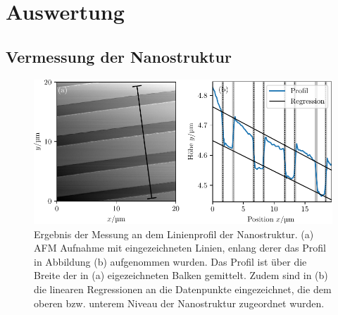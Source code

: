 \section{Auswertung}


\subsection{Vermessung der Nanostruktur}



\begin{figure}
  \centering
  \includegraphics[scale = 1]{../analysis/data/nanostruktur_linien/linien_profil.pdf}
  \caption{Ergebnis der Messung an dem Linienprofil der Nanostruktur. (a) AFM Aufnahme mit eingezeichneten
  Linien, enlang derer das Profil in Abbildung (b) aufgenommen wurden. Das Profil ist
  über die Breite der in (a) eigezeichneten Balken gemittelt. Zudem sind in (b) die linearen Regressionen
  an die Datenpunkte eingezeichnet, die dem oberen bzw. unterem Niveau der Nanostruktur zugeordnet wurden.}
  \label{fig: linien_profil}
\end{figure}



